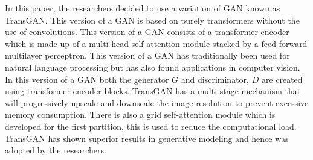 In this paper, the researchers decided to use a variation of GAN known as TransGAN.  This version of a GAN is based on purely transformers without the use of convolutions.  This version of a GAN consists of a transformer encoder which is made up of a multi-head self-attention module stacked by a feed-forward multilayer perceptron.  This version of a GAN has traditionally been used for natural language processing but has also found applications in computer vision.  In this version of a GAN both the generator $G$ and discriminator, $D$ are created using transformer encoder blocks.  TransGAN has a multi-stage mechanism that will progressively upscale and downscale the image resolution to prevent excessive memory consumption.  There is also a grid self-attention module which is developed for the first partition,  this is used to reduce the computational load.  TransGAN has shown superior results in generative modeling and hence was adopted by the researchers.\cite{litReviewLychee}\cite{litReviewTransGanResults}

